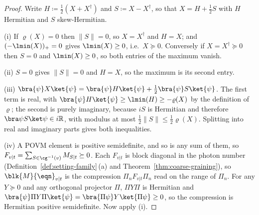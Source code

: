\begin{proof}
Write $H\coloneqq\tfrac12(X+X^\dagger)$ and $S\coloneqq X-X^\dagger$, so that
$X=H+\tfrac12S$ with $H$ Hermitian and $S$ skew-Hermitian.

(i) If $\varrho(X)=0$ then $\lVert S\rVert=0$, so $X=X^\dagger$ and $H=X$; and
$(-\lmin(X))_+=0$ gives $\lmin(X)\ge0$, i.e.\ $X\succeq0$. Conversely if
$X=X^\dagger\succeq0$ then $S=0$ and $\lmin(X)\ge0$, so both entries of the
maximum vanish.

(ii) $S=0$ gives $\lVert S\rVert=0$ and $H=X$, so the maximum is its second
entry.

(iii) $\bra{\psi}X\ket{\psi}=\bra{\psi}H\ket{\psi}
+\tfrac12\bra{\psi}S\ket{\psi}$. The first term is real, with
$\bra{\psi}H\ket{\psi}\ge\lmin(H)\ge-\varrho(X)$ by the definition of
$\varrho$; the second is purely imaginary, because $iS$ is Hermitian and
therefore $\bra\psi S\ket\psi\in i\mathbb{R}$, with modulus at most
$\tfrac12\lVert S\rVert\le\tfrac12\varrho(X)$. Splitting into real and
imaginary parts gives both inequalities.

(iv) A POVM element is positive semidefinite, and so is any sum of them, so
$F_{v|t}=\sum_{S\in\cg^{-1}(v)}M_{S|t}\succeq0$. Each $F_{v|t}$ is block
diagonal in the photon number (Definition~\ref{def:setting-family}\,(a) and
Theorem~\ref{thm:coarse-graining}), so $\blk{M}{\eqn}_{v|t}$ is the compression
$\Pi_nF_{v|t}\Pi_n$ read on the range of $\Pi_n$. For any $Y\succeq0$ and any
orthogonal projector $\Pi$, $\Pi Y\Pi$ is Hermitian and
$\bra{\psi}\Pi Y\Pi\ket{\psi}=\bra{\Pi\psi}Y\ket{\Pi\psi}\ge0$, so the
compression is Hermitian positive semidefinite. Now apply (i).
\end{proof}
